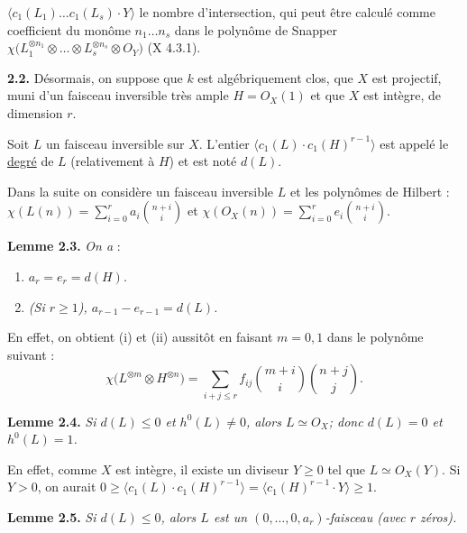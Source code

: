 
\(\langle c_1(L_1)\ldots c_1(L_s)\cdot Y\rangle\) le nombre d'intersection, qui peut être calculé comme coefficient du monôme \(n_1\ldots n_s\) dans le polynôme de Snapper \(\chi\bigl(L_1^{\otimes n_1}\otimes\ldots\otimes L_s^{\otimes n_s}\otimes{O}_Y\bigr)\) (X 4.3.1).

\textbf{2.2.} Désormais, on suppose que \(k\) est algébriquement clos, que \(X\) est projectif, muni d'un faisceau inversible très ample \(H={O}_X(1)\) et que \(X\) est intègre, de dimension \(r\).

Soit \(L\) un faisceau inversible sur \(X\). L'entier \(\langle c_1(L)\cdot c_1(H)^{r-1}\rangle\) est appelé le \uline{degré} de \(L\) (relativement à \(H\)) et est noté \(d(L)\).

Dans la suite on considère un faisceau inversible \(L\) et les polynômes de Hilbert : \(\chi(L(n))=\sum_{i=0}^{r}a_i\binom{n+i}{i}\) et \(\chi({O}_X(n))=\sum_{i=0}^{r}e_i\binom{n+i}{i}\).

\textbf{Lemme 2.3.} \emph{On a} :
\begin{enumerate}[label=(\roman*)]
\item \emph{\(a_r=e_r=d(H)\).}
\item \emph{(Si \(r\ge1\)), \(a_{r-1}-e_{r-1}=d(L)\).}
\end{enumerate}

En effet, on obtient (i) et (ii) aussitôt en faisant \(m=0,1\) dans le polynôme suivant :
\[
\chi\bigl(L^{\otimes m}\otimes H^{\otimes n}\bigr)
=
\sum_{i+j\le r} f_{ij}\binom{m+i}{i}\binom{n+j}{j}.
\]

\textbf{Lemme 2.4.} \emph{Si \(d(L)\le0\) et \(h^0(L)\ne0\), alors \(L\simeq{O}_X\); donc \(d(L)=0\) et \(h^0(L)=1\).}

En effet, comme \(X\) est intègre, il existe un diviseur \(Y\ge0\) tel que \(L\simeq{O}_X(Y)\). Si \(Y>0\), on aurait \(0\ge\langle c_1(L)\cdot c_1(H)^{r-1}\rangle=\langle c_1(H)^{r-1}\cdot Y\rangle\ge1\).

\textbf{Lemme 2.5.} \emph{Si \(d(L)\le0\), alors \(L\) est un \((0,\ldots,0,a_r)\)-faisceau (avec \(r\) zéros).}

